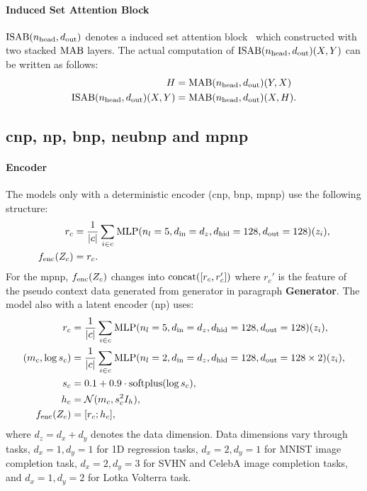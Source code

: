 \paragraph{Induced Set Attention Block} $\text{ISAB}(n_{\text{head}}, d_{\text{out}})$ denotes a induced set attention block~\citep{lee2019set} which constructed with two stacked $\text{MAB}$ layers.
The actual computation of $\text{ISAB}(n_{\text{head}}, d_{\text{out}})(X,Y)$ can be written as follows:
\begin{align*}
    H &= \text{MAB}(n_{\text{head}}, d_{\text{out}})(Y, X)\\
    \text{ISAB}(n_{\text{head}}, d_{\text{out}})(X,Y) &= \text{MAB}(n_{\text{head}}, d_{\text{out}})(X, H).
\end{align*}

\subsection{\texorpdfstring{\gls{cnp}, \gls{np}, \gls{bnp}, \gls{neubnp} and \gls{mpnp}}{CNP, NP, BNP, NeuBNP, and MPNP}}

\paragraph{Encoder}
The models only with a deterministic encoder (\gls{cnp}, \gls{bnp}, \gls{mpnp}) use the following structure:
\begin{align*}
    r_c &= \frac{1}{|c|} \sum_{i \in c} \text{MLP}(n_l=5, d_{\text{in}}=d_z, d_{\text{hid}}=128, d_{\text{out}}=128)(z_i), \\
    f_\text{enc}(Z_c) &= r_c.
\end{align*}
For the \gls{mpnp}, $f_{\text{enc}}(Z_c)$ changes into $\text{concat}([r_c,r_c'])$ where $r_c'$ is the feature of the pseudo context data generated from generator in paragraph \textbf{Generator}.
The model also with a latent encoder (\gls{np}) uses:
\begin{align*}
    r_c &= \frac{1}{|c|} \sum_{i \in c} \text{MLP}(n_l=5, d_{\text{in}}=d_z, d_{\text{hid}}=128, d_{\text{out}}=128)(z_i), \\
    (m_c, \log s_c) &= \frac{1}{|c|} \sum_{i \in c} \text{MLP}(n_l=2, d_{\text{in}}=d_z, d_{\text{hid}}=128, d_{\text{out}}=128 \times 2)(z_i), \\
    s_c &= 0.1 + 0.9 \cdot \text{softplus}(\log s_c), \\
    h_c &= {\mathcal{N}}(m_c, s^2_c I_h), \\
    f_\text{enc}(Z_c) &= [r_c; h_c],
\end{align*}
where $d_z = d_x + d_y$ denotes the data dimension.
Data dimensions vary through tasks, $d_x=1, d_y=1$ for 1D regression tasks, $d_x=2, d_y=1$ for MNIST image completion task,  $d_x=2, d_y=3$ for SVHN and CelebA image completion tasks, and $d_x=1, d_y=2$ for Lotka Volterra task.

